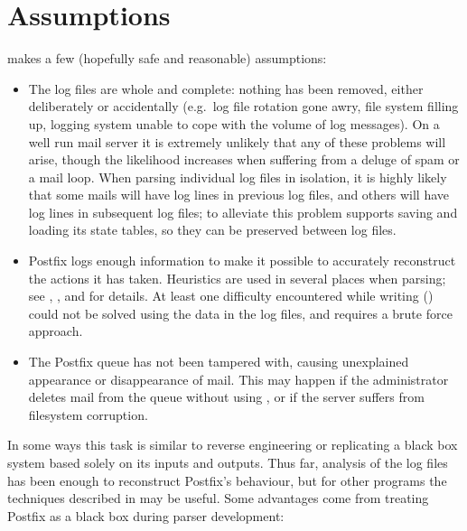 \section{Assumptions}

\parsername{} makes a few (hopefully safe and reasonable) assumptions:

\begin{itemize}

    \item The log files are whole and complete: nothing has been removed,
        either deliberately or accidentally (e.g.\ log file rotation gone
        awry, file system filling up, logging system unable to cope with
        the volume of log messages).  On a well run mail server it is
        extremely unlikely that any of these problems will arise, though
        the likelihood increases when suffering from a deluge of spam or a
        mail loop.  When parsing individual log files in isolation, it is
        highly likely that some mails will have log lines in previous log
        files, and others will have log lines in subsequent log files; to
        alleviate this problem \parsername{} supports saving and loading
        its state tables, so they can be preserved between log files.

    \item Postfix logs enough information to make it possible to accurately
        reconstruct the actions it has taken.  Heuristics are used in
        several places when parsing; see , , and
         for details.  At least
        one difficulty encountered while writing \parsername{}
        () could not be
        solved using the data in the log files, and requires a brute force
        approach.

    \item The Postfix queue has not been tampered with, causing unexplained
        appearance or disappearance of mail.  This may happen if the
        administrator deletes mail from the queue without using
        , or if the server suffers from filesystem
        corruption.

\end{itemize}

In some ways this task is similar to reverse engineering or replicating a
black box system based solely on its inputs and outputs.  Thus far,
analysis of the log files has been enough to reconstruct Postfix's
behaviour, but for other programs the techniques described in
\cite{black-box-error-reporting} may be useful.  Some advantages come from
treating Postfix as a black box during parser development:

